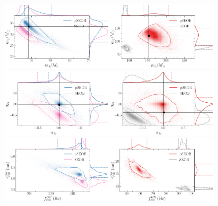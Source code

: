 \documentclass[twocolumn,prd,superscriptaddress,amsfonts,amssymb,amsmath,preprintnumbers]{revtex4-1}
\begin{document}
\begin{figure}[h!]
	\includegraphics[width=0.5\textwidth]{figures/GW150914_simulated_signal_0p5_gr_ngr_m1m2.png}\includegraphics[width=0.5\textwidth]{figures/GW190521_simulated_signal_0p5_gr_ngr_m1m2.png}
	\includegraphics[width=0.5\textwidth]{figures/GW150914_simulated_signal_0p5_gr_ngr_a1za2z.png}\includegraphics[width=0.5\textwidth]{figures/GW190521_simulated_signal_0p5_gr_ngr_a1za2z.png}	
	\includegraphics[width=0.5\textwidth]{figures/GW150914_simulated_signal_0p5_gr_ngr_fgrtaugr.png}\includegraphics[width=0.5\textwidth]{figures/GW190521_simulated_signal_0p5_gr_ngr_fgrtaugr.png}

\end{figure}
\end{document}
